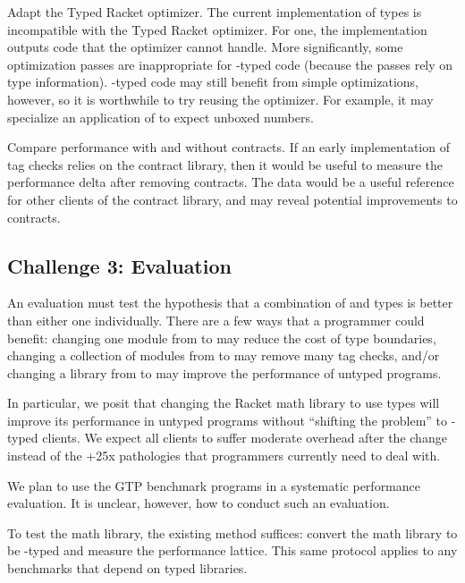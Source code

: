 Adapt the Typed Racket optimizer.
The current implementation of \tshallow{} types is incompatible with the Typed
Racket optimizer.
For one, the implementation outputs code that the optimizer cannot handle.
More significantly, some optimization passes are inappropriate for \tshallow{}-typed
code (because the passes rely on \tdeep{} type information).
\tShallow{}-typed code may still benefit from simple optimizations, however,
so it is worthwhile to try reusing the optimizer.
For example, it may specialize an application of \racketcode{+} to expect unboxed numbers.

Compare performance with and without contracts.
If an early implementation of \tshallow{} tag checks relies on the contract library,
then it would be useful to measure the performance delta after removing contracts.
The data would be a useful reference for other clients of the contract library,
and may reveal potential improvements to contracts.


\subsection{Challenge 3: Evaluation}


An evaluation must test the hypothesis that a combination of \tdeep{} and \tshallow{}
 types is better than either one individually.
There are a few ways that a programmer could benefit:
 changing one module from \tdeep{} to \tshallow{} may reduce the cost of type boundaries,
 changing a collection of modules from \tshallow{} to \tdeep{} may remove many tag checks,
 and/or changing a library from \tdeep{} to \tshallow{} may improve the performance of untyped programs.

In particular, we posit that changing the Racket math library to use \tshallow{}
types will improve its performance in untyped programs without ``shifting the problem''
to \tdeep{}-typed clients.
We expect all clients to suffer moderate overhead after the change instead
of the +25x pathologies that programmers currently need to deal with.

We plan to use the GTP benchmark programs in a systematic performance evaluation.
It is unclear, however, how to conduct such an evaluation.

To test the math library, the existing method suffices:
 convert the math library to be \tshallow{}-typed and measure the performance lattice.
This same protocol applies to any benchmarks that depend on typed libraries.

